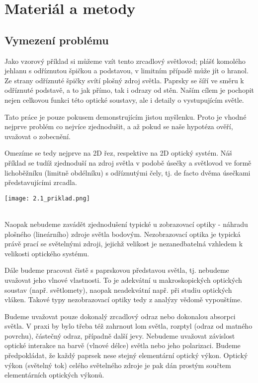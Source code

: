 \chapter{Materiál a metody}

\section{Vymezení problému}


Jako vzorový příklad si můžeme vzít tento zrcadlový světlovod; plášť komolého jehlanu s odříznutou špičkou a podstavou, v limitním případě může jít o hranol. Ze strany odříznuté špičky svítí plošný zdroj světla. Paprsky se šíří ve směru k odříznuté podstavě, a to jak přímo, tak i odrazy od stěn. Naším cílem je pochopit nejen celkovou funkci této optické soustavy, ale i detaily o vystupujícím světle.

Tato práce je pouze pokusem demonstrujícím jistou myšlenku. Proto je vhodné nejprve problém co nejvíce zjednodušit, a až pokud se naše hypotéza ověří, uvažovat o zobecnění.

Omezíme se tedy nejprve na 2D řez, respektive na 2D optický systém. Náš příklad se tudíž zjednoduší na zdroj světla v podobě úsečky a světlovod ve formě lichoběžníku (limitně obdélníku) s odříznutými čely, tj. de facto dvěma úsečkami představujícími zrcadla.

\begin{center}
    \texttt{[image: 2.1\_priklad.png]}\\
    \\
\end{center}

Naopak nebudeme zavádět zjednodušení typické u zobrazovací optiky - náhradu plošného (lineárního) zdroje světla bodovým. Nezobrazovací optika je typická právě prací se světelnými zdroji, jejichž velikost je nezanedbatelná vzhledem k velikosti optického systému.

Dále budeme pracovat čistě s paprskovou představou světla, tj. nebudeme uvažovat jeho vlnové vlastnosti. To je adekvátní u makroskopických optických soustav (např. světlomety), naopak neadekvátní např. při studiu optických vláken. Takové typy nezobrazovací optiky tedy z analýzy vědomě
vypouštíme.

Budeme uvažovat pouze dokonalý zrcadlový odraz nebo dokonalou absorpci světla. V praxi by bylo třeba též zahrnout lom světla, rozptyl (odraz od matného povrchu), částečný odraz, případně další jevy. Nebudeme uvažovat závislost optické interakce na barvě (vlnové délce) světla nebo jeho polarizaci. Budeme předpokládat, že každý paprsek nese stejný elementární optický výkon. Optický výkon (světelný tok) celého světelného zdroje je pak dán prostým součtem elementárních optických výkonů.

